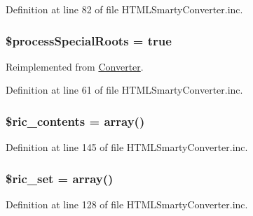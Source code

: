 \-Definition at line 82 of file \-H\-T\-M\-L\-Smarty\-Converter.\-inc.

\hypertarget{class_h_t_m_l_smarty_converter_adcae2bdef17468fc5bf2f15981da497e}{
\subsubsection[{\$process\-Special\-Roots}]{\setlength{\rightskip}{0pt plus 5cm}\$process\-Special\-Roots = true}}\label{class_h_t_m_l_smarty_converter_adcae2bdef17468fc5bf2f15981da497e}


\-Reimplemented from \hyperlink{class_converter_adcae2bdef17468fc5bf2f15981da497e}{\-Converter}.



\-Definition at line 61 of file \-H\-T\-M\-L\-Smarty\-Converter.\-inc.

\hypertarget{class_h_t_m_l_smarty_converter_a7b40b8b019e05c97fceff0a458b9192c}{
\subsubsection[{\$ric\-\_\-contents}]{\setlength{\rightskip}{0pt plus 5cm}\$ric\-\_\-contents = array()}}\label{class_h_t_m_l_smarty_converter_a7b40b8b019e05c97fceff0a458b9192c}


\-Definition at line 145 of file \-H\-T\-M\-L\-Smarty\-Converter.\-inc.

\hypertarget{class_h_t_m_l_smarty_converter_a84e3c5e32f1d02114c9d126d5864d06b}{
\subsubsection[{\$ric\-\_\-set}]{\setlength{\rightskip}{0pt plus 5cm}\$ric\-\_\-set = array()}}\label{class_h_t_m_l_smarty_converter_a84e3c5e32f1d02114c9d126d5864d06b}


\-Definition at line 128 of file \-H\-T\-M\-L\-Smarty\-Converter.\-inc.

